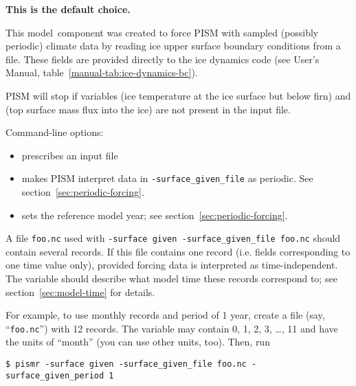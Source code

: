 \documentclass[titlepage,letterpaper,final]{scrartcl}
\begin{document}
\begin{center}
  \textbf{This is the default choice.}
\end{center}

This model~component was created to force PISM with sampled (possibly periodic)
climate data by reading ice upper surface boundary conditions from a file.
These fields are provided directly to the ice dynamics code (see User's
Manual, table~\ref*{manual-tab:ice-dynamics-bc}).

PISM will stop if variables  (ice temperature at the
ice surface but below firn) and  (top surface
mass flux into the ice) are not present in the input file.

Command-line options:
\begin{itemize}
\item {} prescribes an input file
\item {} makes PISM interpret data in
\texttt{-surface_given_file} as periodic. See section~\ref{sec:periodic-forcing}.
\item {} sets the reference model year;
  see section~\ref{sec:periodic-forcing}.
\end{itemize}

A file \texttt{foo.nc} used with \texttt{-surface given -surface_given_file
  foo.nc} should contain several records. If this file contains one record
(i.e. fields corresponding to one time value only), provided forcing data is
interpreted as time-independent. The  variable should describe
what model time these records correspond to; see section~\ref{sec:model-time}
for details.

For example, to use monthly records and period of 1 year, create a file (say,
``\texttt{foo.nc}'') with 12 records. The  variable may contain
0, 1, 2, 3, \dots, 11 and have the units of ``month'' (you can use other units,
too). Then, run
\begin{verbatim}
$ pismr -surface given -surface_given_file foo.nc -surface_given_period 1
\end{verbatim}
\end{document}
